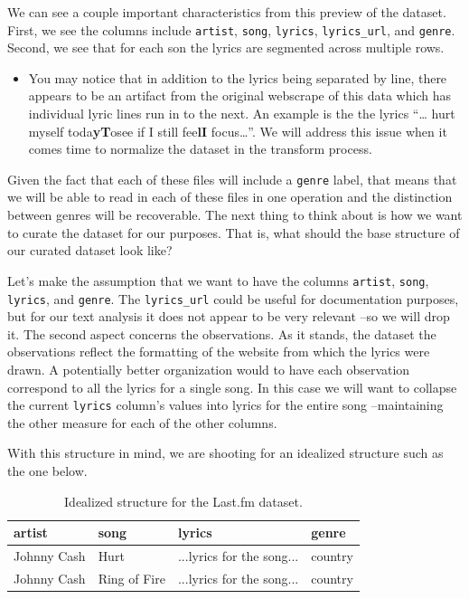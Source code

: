 \documentclass[
]{article}
\newenvironment{rmdblock}[1]
  {\begin{shaded*}
  \begin{itemize}
  \renewcommand{\labelitemi}{
    \raisebox{-.5\height}[0pt][0pt]{
      {\setkeys{Gin}{width=2em,keepaspectratio}\texttt{[image: assets/images/\#1]}}
    }
  }
  \item
  }
  {
  \end{itemize}
  \end{shaded*}
  }
\newenvironment{rmdtip}
  {\begin{rmdblock}{tip}}
  {\end{rmdblock}}
\begin{document}
We can see a couple important characteristics from this preview of the dataset. First, we see the columns include \texttt{artist}, \texttt{song}, \texttt{lyrics}, \texttt{lyrics\_url}, and \texttt{genre}. Second, we see that for each son the lyrics are segmented across multiple rows.

\begin{rmdtip}
You may notice that in addition to the lyrics being separated by line,
there appears to be an artifact from the original webscrape of this data
which has individual lyric lines run in to the next. An example is the
the lyrics ``\ldots{} hurt myself toda\textbf{yT}osee if I still
fee\textbf{lI} focus\ldots{}''. We will address this issue when it comes
time to normalize the dataset in the transform process.
\end{rmdtip}

Given the fact that each of these files will include a \texttt{genre} label, that means that we will be able to read in each of these files in one operation and the distinction between genres will be recoverable. The next thing to think about is how we want to curate the dataset for our purposes. That is, what should the base structure of our curated dataset look like?

Let's make the assumption that we want to have the columns \texttt{artist}, \texttt{song}, \texttt{lyrics}, and \texttt{genre}. The \texttt{lyrics\_url} could be useful for documentation purposes, but for our text analysis it does not appear to be very relevant --so we will drop it. The second aspect concerns the observations. As it stands, the dataset the observations reflect the formatting of the website from which the lyrics were drawn. A potentially better organization would to have each observation correspond to all the lyrics for a single song. In this case we will want to collapse the current \texttt{lyrics} column's values into lyrics for the entire song --maintaining the other measure for each of the other columns.

With this structure in mind, we are shooting for an idealized structure such as the one below.

\begin{table}

\caption{\label{tab:cd-structured-idealized-dataset}Idealized structure for the Last.fm dataset.}
\centering
\begin{tabular}[t]{llll}
\toprule
artist & song & lyrics & genre\\
\midrule
Johnny Cash & Hurt & ...lyrics for the song... & country\\
Johnny Cash & Ring of Fire & ...lyrics for the song... & country\\
\bottomrule
\end{tabular}
\end{table}
\end{document}

